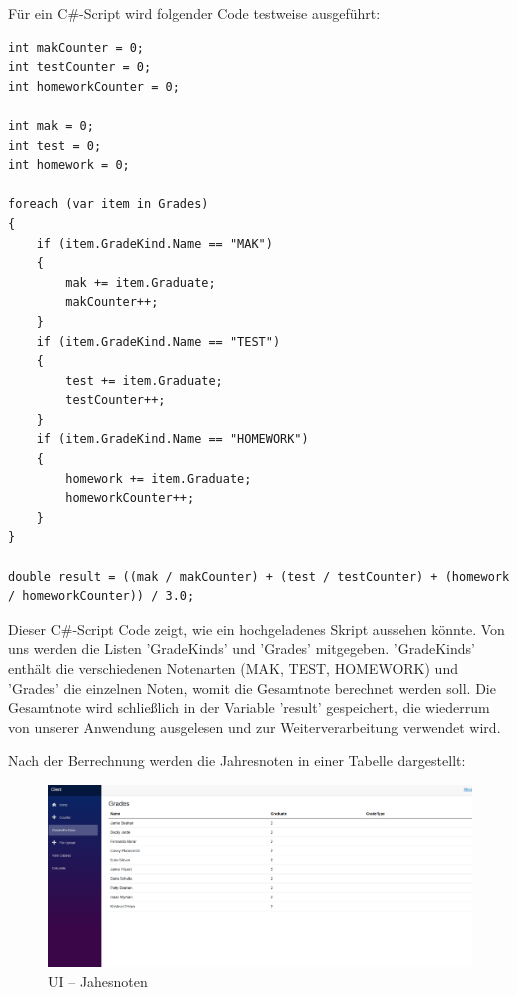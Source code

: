 Für ein C\#-Script wird folgender Code testweise ausgeführt:
    
\begin{lstlisting}[language={[Sharp]C},caption=C\#-Script,label=lst:impl:csctest]
int makCounter = 0;
int testCounter = 0;
int homeworkCounter = 0;

int mak = 0;
int test = 0;
int homework = 0;

foreach (var item in Grades)
{
    if (item.GradeKind.Name == "MAK")
    {
        mak += item.Graduate;
        makCounter++;
    }
    if (item.GradeKind.Name == "TEST")
    {
        test += item.Graduate;
        testCounter++;
    }
    if (item.GradeKind.Name == "HOMEWORK")
    {
        homework += item.Graduate;
        homeworkCounter++;
    }
}

double result = ((mak / makCounter) + (test / testCounter) + (homework / homeworkCounter)) / 3.0;
\end{lstlisting}

Dieser C\#-Script Code zeigt, wie ein hochgeladenes Skript aussehen könnte. Von uns werden die 
Listen 'GradeKinds' und 'Grades' mitgegeben. 'GradeKinds' enthält die verschiedenen Notenarten 
(MAK, TEST, HOMEWORK) und 'Grades' die einzelnen Noten, womit die Gesamtnote berechnet werden soll. 
Die Gesamtnote wird schließlich in der Variable 'result' gespeichert, die wiederrum von unserer 
Anwendung ausgelesen und zur Weiterverarbeitung verwendet wird.

\newpage
{}

Nach der Berrechnung werden die Jahresnoten in einer Tabelle dargestellt:

\begin{figure}[H]
    \centering
    \includegraphics[scale=0.5]{pics/GradesForClass.png}
    \caption{UI -- Jahesnoten}
    \label{fig:impl:GradesForClass}
\end{figure}



